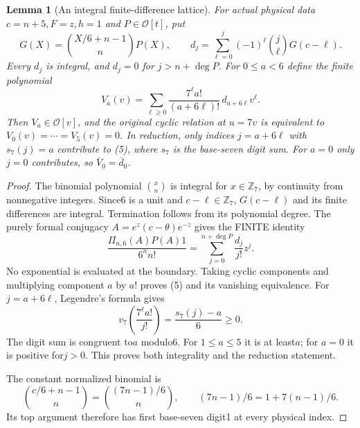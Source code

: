 \documentclass[11pt]{article}
\newtheorem{lemma}{Lemma}
\begin{document}
\begin{lemma}[An integral finite-difference lattice]\label{lem:mahler}
For actual physical data $c=n+5,F=z,h=1$ and $P\in\mathcal O[t]$,
put
\[
 G(X)=\binom{X/6+n-1}{n}P(X),\qquad
 d_j=\sum_{\ell=0}^j(-1)^\ell\binom j\ell G(c-\ell).
\]
Every $d_j$ is integral, and $d_j=0$ for $j>n+\deg P$.
For $0\le a<6$ define the finite polynomial
\[
 V_a(v)=\sum_{\ell\ge0}
          \frac{7^\ell a!}{(a+6\ell)!}\,d_{a+6\ell}v^\ell.
                                                               \tag{5}
\]
Then $V_a\in\mathcal O[v]$, and the original cyclic relation
at $u=7v$ is equivalent to $V_0(v)=\cdots=V_5(v)=0$.
In reduction, only indices $j=a+6\ell$ with $s_7(j)=a$
contribute to (5), where $s_7$ is the base-seven digit sum.
For $a=0$ only $j=0$ contributes, so $\overline V_0=\overline d_0$.
\end{lemma}
\begin{proof}
The binomial polynomial $\binom{x}{n}$ is integral for $x\in
\mathbb Z_7$, by continuity from nonnegative integers.
Since6 is a unit and $c-\ell\in\mathbb Z_7$, $G(c-\ell)$
and its finite differences are integral. Termination follows
from its polynomial degree.
The purely formal conjugacy
$A=e^z(c-\theta)e^{-z}$ gives the FINITE identity
\[
 \frac{\Pi_{n,6}(A)P(A)1}{6^n n!}
       =\sum_{j=0}^{n+\deg P}\frac{d_j}{j!}z^j .
\]
No exponential is evaluated at the boundary.
Taking cyclic components and multiplying component $a$ by $a!$
proves (5) and its vanishing equivalence.
For $j=a+6\ell$, Legendre's formula gives
\[
 v_7\left(\frac{7^\ell a!}{j!}\right)
       =\frac{s_7(j)-a}{6}\ge0 .
\]
The digit sum is congruent to$a$ modulo6. For $1\le a\le5$
it is at least$a$; for $a=0$ it is positive for$j>0$.
This proves both integrality and the reduction statement.

The constant normalized binomial is
\[
 \binom{c/6+n-1}{n}=\binom{(7n-1)/6}{n},\qquad
 (7n-1)/6=1+7(n-1)/6.
\]
Its top argument therefore has first base-seven digit1 at
every physical index.
\end{proof}
\end{document}
